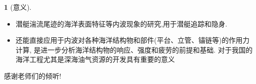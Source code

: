 \documentclass[UTF8]{ctexbeamer}	%
\theoremstyle{plain}
\theoremstyle{definition}
\newtheorem{emt}{}[section]
\theoremstyle{remark}
\numberwithin{equation}{section}
\begin{document}
\begin{frame}
    \begin{emt}[意义\cite{wangzhan_1589}]
        \begin{itemize}
            \item 潜艇湍流尾迹的海洋表面特征等内波现象的研究,用于潜艇追踪和隐身.
            \item 还能直接应用于内波对各种海洋结构物和部件(平台、立管、锚链等)的作用力计算,
            是进一步分析海洋结构物的响应、强度和疲劳的前提和基础.
            对于我国的海洋工程尤其是深海油气资源的开发具有重要的意义
        \end{itemize}
        
    \end{emt}
    
\end{frame}

\begin{frame}
    


\end{frame}

\begin{frame}
    \begin{center}
        \Huge 感谢老师们的倾听!
    \end{center}
\end{frame}


\end{document}
